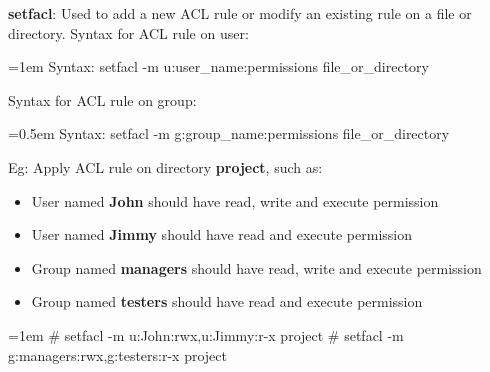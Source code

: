 \setlength{\columnsep}{3pt}
\begin{flushleft}
	\textbf{setfacl}: Used to add a new ACL rule or modify an existing rule on a file or directory.
	\newline
	Syntax for ACL rule on user:
	\begin{tcolorbox}[breakable,notitle,boxrule=-0pt,colback=pink,colframe=pink]
		\color{black}
		\font=1em
		Syntax: setfacl -m u:user\_name:permissions file\_or\_directory
		\font=4pt
	\end{tcolorbox}
	
	Syntax for ACL rule on group:
	\begin{tcolorbox}[breakable,notitle,boxrule=-0pt,colback=pink,colframe=pink]
	\color{black}
	\font=0.5em
	Syntax: setfacl -m g:group\_name:permissions file\_or\_directory
	\font=4pt
	\end{tcolorbox}

	\item Eg: Apply ACL rule on directory \textbf{project}, such as:
	\begin{itemize}
		\item User named \textbf{John} should have read, write and execute permission
		\item User named \textbf{Jimmy} should have read and execute permission
		\item Group named \textbf{managers} should have read, write and execute permission
		\item Group named \textbf{testers} should have read and execute permission
	\end{itemize}
	\bigskip

	\begin{tcolorbox}[breakable,notitle,boxrule=-0pt,colback=black,colframe=black]
		\color{green}
		\font=1em
		\# setfacl -m u:John:rwx,u:Jimmy:r-x project
		\newline
		\# setfacl -m g:managers:rwx,g:testers:r-x project
		\font=4pt
	\end{tcolorbox}
\newpage
	

\end{flushleft}
